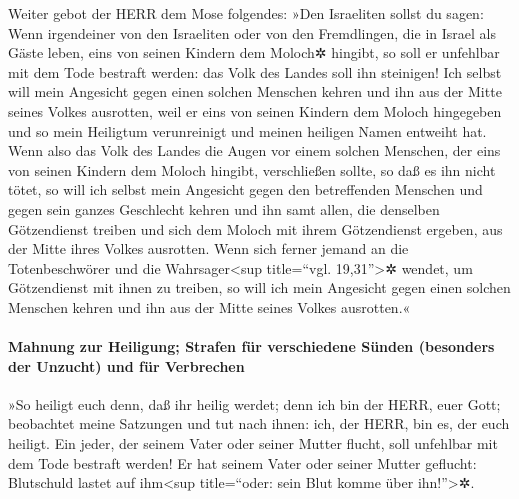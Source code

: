 Weiter gebot der HERR dem Mose folgendes:
»Den Israeliten sollst du sagen: Wenn irgendeiner von den
Israeliten oder von den Fremdlingen, die in Israel als Gäste leben, eins
von seinen Kindern dem Moloch✲ hingibt, so soll er unfehlbar mit dem
Tode bestraft werden: das Volk des Landes soll ihn steinigen!
Ich selbst will mein Angesicht gegen einen solchen
Menschen kehren und ihn aus der Mitte seines Volkes ausrotten, weil er
eins von seinen Kindern dem Moloch hingegeben und so mein Heiligtum
verunreinigt und meinen heiligen Namen entweiht hat. Wenn
also das Volk des Landes die Augen vor einem solchen Menschen, der eins
von seinen Kindern dem Moloch hingibt, verschließen sollte, so daß es
ihn nicht tötet, so will ich selbst mein Angesicht gegen
den betreffenden Menschen und gegen sein ganzes Geschlecht kehren und
ihn samt allen, die denselben Götzendienst treiben und sich dem Moloch
mit ihrem Götzendienst ergeben, aus der Mitte ihres Volkes ausrotten.
Wenn sich ferner jemand an die Totenbeschwörer und die
Wahrsager\textless sup title=``vgl. 19,31''\textgreater✲ wendet, um
Götzendienst mit ihnen zu treiben, so will ich mein Angesicht gegen
einen solchen Menschen kehren und ihn aus der Mitte seines Volkes
ausrotten.«

\hypertarget{mahnung-zur-heiligung-strafen-fuxfcr-verschiedene-suxfcnden-besonders-der-unzucht-und-fuxfcr-verbrechen}{%
\paragraph{Mahnung zur Heiligung; Strafen für verschiedene Sünden
(besonders der Unzucht) und für
Verbrechen}\label{mahnung-zur-heiligung-strafen-fuxfcr-verschiedene-suxfcnden-besonders-der-unzucht-und-fuxfcr-verbrechen}}

»So heiligt euch denn, daß ihr heilig werdet; denn ich bin
der HERR, euer Gott; beobachtet meine Satzungen und tut
nach ihnen: ich, der HERR, bin es, der euch heiligt. Ein
jeder, der seinem Vater oder seiner Mutter flucht, soll unfehlbar mit
dem Tode bestraft werden! Er hat seinem Vater oder seiner Mutter
geflucht: Blutschuld lastet auf ihm\textless sup title=``oder: sein Blut
komme über ihn!''\textgreater✲.


